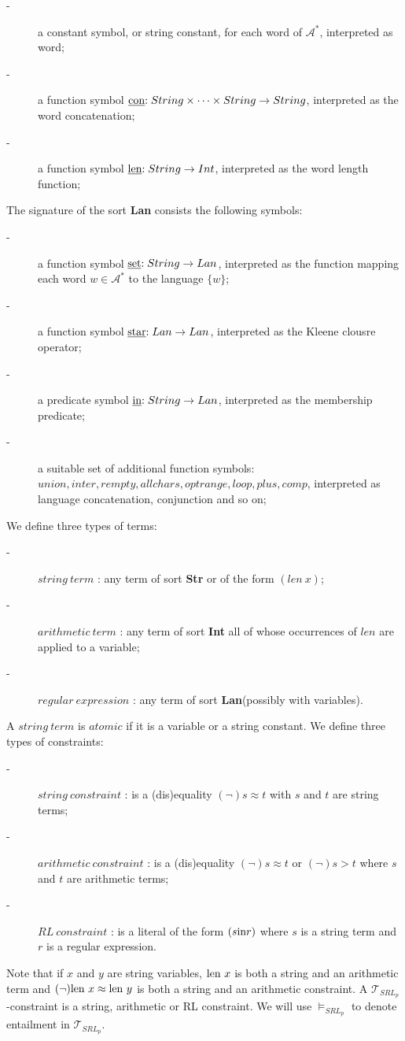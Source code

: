 \begin{description}
	\item[-] a constant symbol, or string constant, for each word of \(\mathcal{A}^* \), interpreted as word;
	\item[-] a function symbol \($\underline{con}$ : String \times \cdots \times String \to String\), interpreted as the word concatenation;
	\item[-] a function symbol \($\underline{len}$ : String  \to Int \), interpreted as the word length function;    
\end{description}
The signature of the sort  \textbf{Lan} consists the following symbols:
\begin{description}
	\item[-] a function symbol \($\underline{set}$ : String  \to Lan \), interpreted as the function mapping each word  \( w \in \mathcal{A}^* \) to the language  \(\{w\}\);
	\item[-] a function symbol \($\underline{star}$ : Lan \to Lan\), interpreted as the Kleene clousre operator;
	\item[-] a predicate symbol \($\underline{in}$ : String \to Lan\), interpreted as the membership predicate;	
	\item[-] a suitable set of additional function symbols: \(union, inter, rempty, allchars, opt range, loop, plus, comp \), interpreted as language concatenation, conjunction and so on;
\end{description}
We define three types of terms:
\begin{description}
	\item[-] \( string \ term \) : any term of sort \textbf{Str} or of the form \((len \ x )\);
	\item[-] \( arithmetic \ term \) : any term of sort \textbf{Int} all of whose occurrences of \(len\) are applied to a variable;
    \item[-] \( regular \ expression \) : any term of sort \textbf{Lan}(possibly with variables).
\end{description}
A \( string \ term \) is \( atomic \) if it is a variable or a string constant. We define three types of constraints:
\begin{description}
	\item[-] \( string \ constraint \) : is a (dis)equality  \( (\neg) s \approx t \) with \(s\) and \(t\) are string terms;
	\item[-] \( arithmetic \ constraint \) : is a (dis)equality  \( (\neg) s \approx t \) or \( (\neg) s > t \) where \(s\) and \(t\) are arithmetic terms;
	\item[-] \( RL \ constraint \) : is a literal of the form \((s \textnormal{in} r)\) where \(s\) is a string term and \(r\) is a regular expression.
\end{description}

Note that if \(x\) and \(y\) are string variables, \(\textnormal{len} \ x\) is both a string and an arithmetic term and  \((\neg)\textnormal{len} \ x \approx \textnormal{len} \ y\) is both a string and an arithmetic constraint. A \(\mathcal{T}_{SRL_p}\)-constraint is a string, arithmetic or RL constraint. We will use \( \models_{SRL_{p}}\) to denote entailment in \(\mathcal{T}_{SRL_p}\).